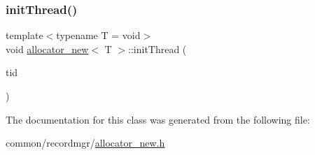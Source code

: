 \mbox{\label{classallocator__new_a4b65439e6dc7bbd4da71728599e12895}} 
\subsubsection{\texorpdfstring{init\+Thread()}{initThread()}}
{\footnotesize\ttfamily template$<$typename T  = void$>$ \\
void \hyperlink{classallocator__new}{allocator\+\_\+new}$<$ T $>$\+::init\+Thread (\begin{DoxyParamCaption}\item[{const int}]{tid }\end{DoxyParamCaption})\hspace{0.3cm}{\ttfamily [inline]}}



The documentation for this class was generated from the following file\+:\begin{DoxyCompactItemize}
\item 
common/recordmgr/\hyperlink{allocator__new_8h}{allocator\+\_\+new.\+h}\end{DoxyCompactItemize}
